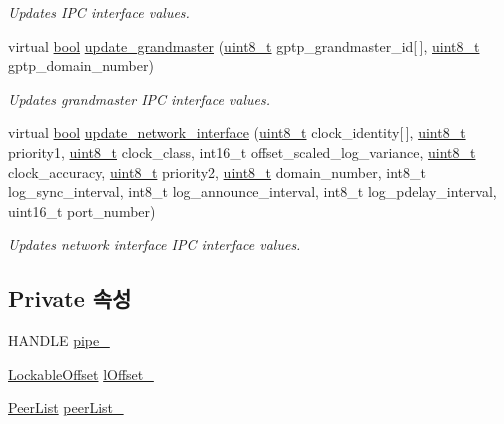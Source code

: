 \begin{DoxyCompactItemize}
\begin{DoxyCompactList}\small\item\em Updates I\+PC interface values. \end{DoxyCompactList}\item 
virtual \hyperlink{avb__gptp_8h_af6a258d8f3ee5206d682d799316314b1}{bool} \hyperlink{class_windows_named_pipe_i_p_c_ab4218ec21d3322c365b300cfdb23b263}{update\+\_\+grandmaster} (\hyperlink{stdint_8h_aba7bc1797add20fe3efdf37ced1182c5}{uint8\+\_\+t} gptp\+\_\+grandmaster\+\_\+id\mbox{[}$\,$\mbox{]}, \hyperlink{stdint_8h_aba7bc1797add20fe3efdf37ced1182c5}{uint8\+\_\+t} gptp\+\_\+domain\+\_\+number)
\begin{DoxyCompactList}\small\item\em Updates grandmaster I\+PC interface values. \end{DoxyCompactList}\item 
virtual \hyperlink{avb__gptp_8h_af6a258d8f3ee5206d682d799316314b1}{bool} \hyperlink{class_windows_named_pipe_i_p_c_ad971ad6fa412e49d34a5ca927815e715}{update\+\_\+network\+\_\+interface} (\hyperlink{stdint_8h_aba7bc1797add20fe3efdf37ced1182c5}{uint8\+\_\+t} clock\+\_\+identity\mbox{[}$\,$\mbox{]}, \hyperlink{stdint_8h_aba7bc1797add20fe3efdf37ced1182c5}{uint8\+\_\+t} priority1, \hyperlink{stdint_8h_aba7bc1797add20fe3efdf37ced1182c5}{uint8\+\_\+t} clock\+\_\+class, int16\+\_\+t offset\+\_\+scaled\+\_\+log\+\_\+variance, \hyperlink{stdint_8h_aba7bc1797add20fe3efdf37ced1182c5}{uint8\+\_\+t} clock\+\_\+accuracy, \hyperlink{stdint_8h_aba7bc1797add20fe3efdf37ced1182c5}{uint8\+\_\+t} priority2, \hyperlink{stdint_8h_aba7bc1797add20fe3efdf37ced1182c5}{uint8\+\_\+t} domain\+\_\+number, int8\+\_\+t log\+\_\+sync\+\_\+interval, int8\+\_\+t log\+\_\+announce\+\_\+interval, int8\+\_\+t log\+\_\+pdelay\+\_\+interval, uint16\+\_\+t port\+\_\+number)
\begin{DoxyCompactList}\small\item\em Updates network interface I\+PC interface values. \end{DoxyCompactList}\end{DoxyCompactItemize}
\subsection*{Private 속성}
\begin{DoxyCompactItemize}
\item 
H\+A\+N\+D\+LE \hyperlink{class_windows_named_pipe_i_p_c_a4757a4c2a34a6b9ea12d3be6bc37c9a3}{pipe\+\_\+}
\item 
\hyperlink{class_lockable_offset}{Lockable\+Offset} \hyperlink{class_windows_named_pipe_i_p_c_a5b017962912e5549312d6017c48345a8}{l\+Offset\+\_\+}
\item 
\hyperlink{class_peer_list}{Peer\+List} \hyperlink{class_windows_named_pipe_i_p_c_a14d4ab8d3c4d6d39463defa27105912d}{peer\+List\+\_\+}
\end{DoxyCompactItemize}


